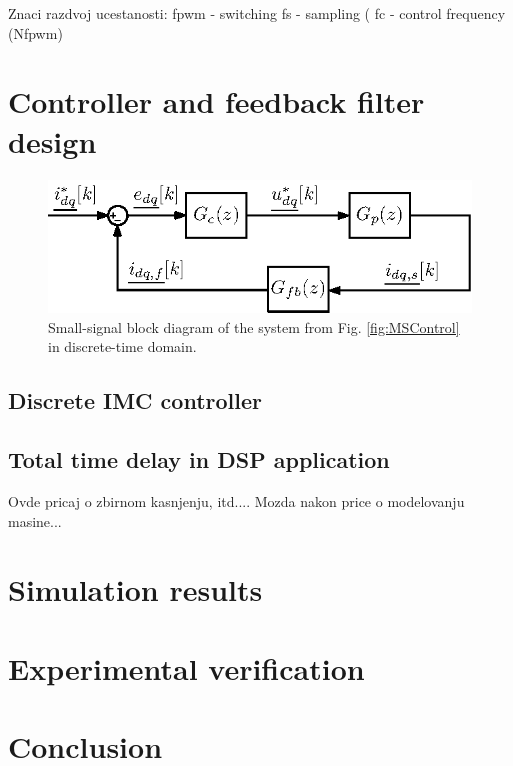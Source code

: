 \documentclass[journal]{IEEEtran}
\begin{document}
Znaci razdvoj ucestanosti:
fpwm - switching
fs - sampling (
fc - control frequency (Nfpwm)



\section{Controller and feedback filter design}

\begin{figure}[t!]
    \centerline{\includegraphics[width=0.95\linewidth]{figures/small_signal.eps}}
    \caption{Small-signal block diagram of the system from Fig. \ref{fig:MSControl} in discrete-time domain.}
    \label{fig:SmallSignal}
\end{figure}

\subsection{Discrete IMC controller}

\subsection{Total time delay in DSP application}
Ovde pricaj o zbirnom kasnjenju, itd....
Mozda nakon price o modelovanju masine...



\section{Simulation results}

\section{Experimental verification}

\section{Conclusion}


\ifCLASSOPTIONcaptionsoff
  \newpage
\fi



\end{document}
